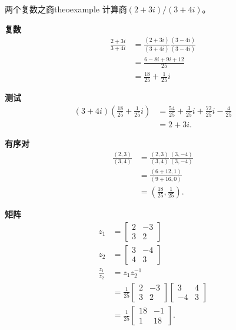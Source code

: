 \begin{myexample}{两个复数之商}{theoexample}
计算商$(2+3 i) /(3+4 i)$。

\textbf{复数}
$$
  \begin{aligned}
    \frac{2+3 i}{3+4 i} & =\frac{(2+3 i)}{(3+4 i)} \frac{(3-4 i)}{(3-4 i)} \\
                        & =\frac{6-8 i+9 i+12}{25}                         \\
                        & =\frac{18}{25}+\frac{1}{25} i
  \end{aligned}
$$

\textbf{测试}
$$
  \begin{aligned}
    (3+4 i)\left(\frac{18}{25}+\frac{1}{25} i\right) & =\frac{54}{25}+\frac{3}{25} i+\frac{72}{25} i-\frac{4}{25} \\
                                                     & =2+3 i .
  \end{aligned}
$$

\textbf{有序对}
$$
  \begin{aligned}
    \frac{(2,3)}{(3,4)} & =\frac{(2,3)}{(3,4)} \frac{(3,-4)}{(3,-4)}  \\
                        & =\frac{(6+12,1)}{(9+16,0)}                  \\
                        & =\left(\frac{18}{25}, \frac{1}{25}\right) .
  \end{aligned}
$$

\textbf{矩阵}
$$
  \begin{aligned}
    z_{1}               & =\left[\begin{array}{cc}
        2 & -3 \\
        3 & 2
      \end{array}\right]                                                     \\
    z_{2}               & =\left[\begin{array}{cc}
        3 & -4 \\
        4 & 3
      \end{array}\right]                                                     \\
    \frac{z_{1}}{z_{2}} & =z_{1} z_{2}^{-1}                                                                             \\
                        & =\frac{1}{25}\left[\begin{array}{cc}
        2 & -3 \\
        3 & 2
      \end{array}\right]\left[\begin{array}{cc}
        3  & 4 \\
        -4 & 3
      \end{array}\right] \\
                        & =\frac{1}{25}\left[\begin{array}{cc}
        18 & -1 \\
        1  & 18
      \end{array}\right] .
  \end{aligned}
$$
\end{myexample}

